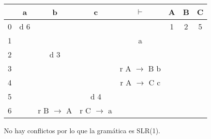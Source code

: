 \documentclass[\main/ApuntesPL.tex]{subfiles}
\begin{document}
        \begin{center}
          \begin{tabular}{||c c c c c c c c||}
            \hline
            & a & b & c & $\vdash$ & A & B & C \\ [0.5ex]
            \hline\hline
            0 & d 6 &  &  &  & 1 & 2 & 5\\
            \hline
            1 &  &  &  & a &  &  &  \\
            \hline
            2 &  & d 3 &  &  &  &  &  \\
            \hline
            3 &  &  &  & r A $\rightarrow$ B b &  &  &  \\
            \hline
            4 &  &  &  & r A $\rightarrow$ C c &  &  &  \\
            \hline
            5 &  &  & d 4 &  &  &  &  \\
            \hline
            6 &  & r B $\rightarrow$ A & r C $\rightarrow$ a &  &  &  &  \\
            [1ex]
            \hline
          \end{tabular}
        \end{center}

        \par
        No hay conflictos por lo que la gramática es SLR(1).
\end{document}
